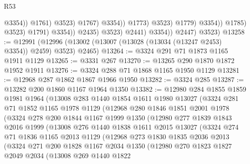 \begin{lexlean}{R53}
\begin{coremodule}
                                                    @3354))
                                                @1761)
                                              @3523)
                                            @1767)
                                          @3354))
                                      @1773)
                                    @3523)
                                  @1779)
                                @3354))
                            @1785)
                          @3523)
                        @1791)
                      @3354))
                  @2435)
                @3523)
              @2441)
            @3354))
        @2447)
      @3523)
@13258 := @12991 (@12996 (@13002 (@13007 (@13028 (@13034 (@13247 @2453) @3354)) @2459) @3523) @2465)
@13264 := @3324 @291 @71 @1873 @1165 @1911 @1129
@13265 := @3331 @267
@13270 := @13265 @290 @1870 @1872 @1952 @1911
@13276 := @3324 @288 @71 @1868 @1165 @1950 @1129
@13281 := @12968 @287 @1862 @1867 @1966 @1950
@13282 := @3324 @285
@13287 := @13282 @200 @1860 @1167 @1964 @1350
@13382 := @12980
    @284
    @1855
    @1859
    @1981
    @1964
    (@13008
      @283
      @1440
      @1854
      @1611
      @1980
      @13027
      (@3324
        @281
        @71
        @1852
        @1165
        @1978
        @1129
        (@12968
          @280
          @1846
          @1851
          @2001
          @1978
          (@3324
            @278
            @200
            @1844
            @1167
            @1999
            @1350
            (@12980
              @277
              @1839
              @1843
              @2016
              @1999
              (@13008
                @276
                @1440
                @1838
                @1611
                @2015
                @13027
                (@3324
                  @274
                  @71
                  @1836
                  @1165
                  @2013
                  @1129
                  (@12968
                    @273
                    @1830
                    @1835
                    @2036
                    @2013
                    (@3324
                      @271
                      @200
                      @1828
                      @1167
                      @2034
                      @1350
                      (@12980
                        @270
                        @1823
                        @1827
                        @2049
                        @2034
                        (@13008
                          @269
                          @1440
                          @1822

\end{coremodule}
\end{lexlean}

